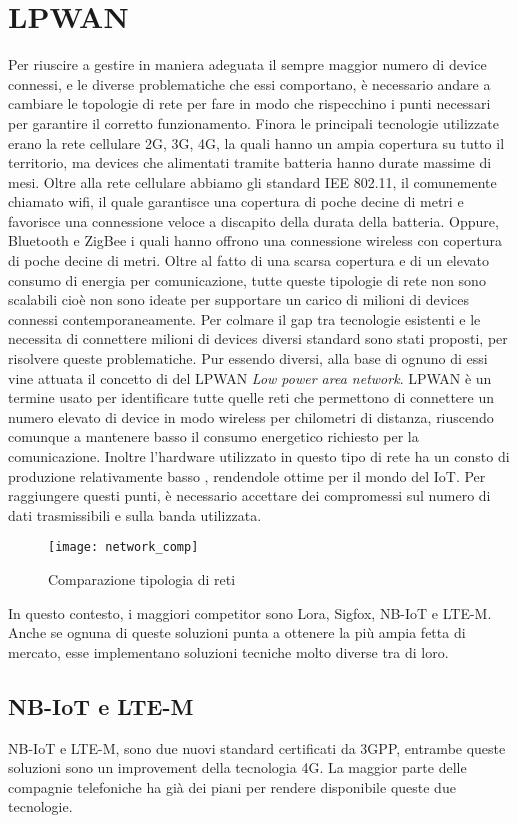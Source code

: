 \section{LPWAN}
Per riuscire a gestire in maniera adeguata il sempre maggior numero di device
connessi, e le diverse problematiche che essi comportano, è necessario andare a
cambiare le topologie di rete per fare in modo che rispecchino i punti necessari
per garantire il corretto funzionamento. Finora le principali tecnologie
utilizzate erano la rete cellulare 2G, 3G, 4G, la quali hanno un ampia copertura
su tutto il territorio, ma devices che alimentati tramite batteria hanno durate
massime di mesi. Oltre alla rete cellulare abbiamo gli standard IEE 802.11, il
comunemente chiamato wifi, il quale garantisce una copertura di poche decine di
metri e favorisce una connessione veloce a discapito della durata della
batteria. Oppure, Bluetooth e ZigBee i quali hanno offrono una connessione
wireless con copertura di poche decine di metri. Oltre al fatto di una scarsa
copertura e di un elevato consumo di energia per comunicazione, tutte queste
tipologie di rete non sono scalabili cioè non sono ideate per supportare un
carico di milioni di devices connessi contemporaneamente. Per colmare il gap tra
tecnologie esistenti e le necessita di connettere milioni di devices diversi
standard sono stati proposti, per risolvere queste problematiche. Pur essendo
diversi, alla base di ognuno di essi vine attuata il concetto di del LPWAN
\emph{Low power area network}. LPWAN è un termine usato per identificare tutte
quelle reti che permettono di connettere un numero elevato di device in modo
wireless per chilometri di distanza, riuscendo comunque a mantenere basso il
consumo energetico richiesto per la comunicazione. Inoltre l'hardware utilizzato
in questo tipo di rete ha un consto di produzione relativamente basso ,
rendendole ottime per il mondo del IoT. Per raggiungere questi punti, è
necessario accettare dei compromessi sul numero di dati trasmissibili e sulla
banda utilizzata. 

\begin{figure}[h]
\centering 
\texttt{[image: network\_comp]}
\caption{Comparazione tipologia di reti}
\end{figure}

In questo contesto, i maggiori competitor sono Lora, Sigfox, NB-IoT e LTE-M.
Anche se ognuna di queste soluzioni punta a ottenere la più ampia fetta di
mercato, esse implementano soluzioni tecniche molto diverse tra di loro.
\subsection{NB-IoT e LTE-M}
NB-IoT e LTE-M, sono due nuovi standard certificati da 3GPP, entrambe queste
soluzioni sono un improvement della tecnologia 4G. La maggior parte delle
compagnie telefoniche ha già dei piani per rendere disponibile queste due
tecnologie.

